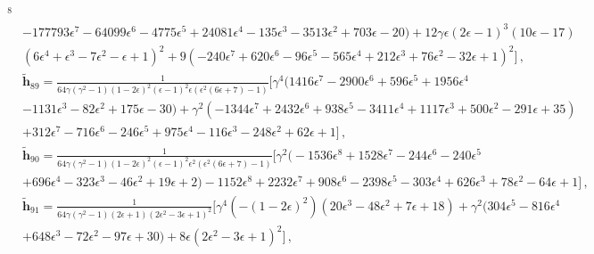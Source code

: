 \begin{align}
\begin{split}
^8\\&-177793 \epsilon ^7-64099 \epsilon ^6-4775 \epsilon ^5+24081 \epsilon ^4-135 \epsilon ^3-3513 \epsilon ^2+703 \epsilon -20\big)+12 \gamma  \epsilon  (2 \epsilon -1)^3 (10 \epsilon -17)\\& \left(6 \epsilon ^4+\epsilon ^3-7 \epsilon ^2-\epsilon +1\right)^2+9 \left(-240 \epsilon ^7+620 \epsilon ^6-96 \epsilon ^5-565 \epsilon ^4+212 \epsilon ^3+76 \epsilon ^2-32 \epsilon +1\right)^2\Bigg]\,,\\& \boldsymbol{\tilde h}_{89}=\frac{1}{64 \gamma  \left(\gamma ^2-1\right) (1-2 \epsilon )^2 (\epsilon -1)^2 \epsilon  \left(\epsilon ^2 (6 \epsilon +7)-1\right)}\Bigg[\gamma ^4 \big(1416 \epsilon ^7-2900 \epsilon ^6+596 \epsilon ^5+1956 \epsilon ^4\\&-1131 \epsilon ^3-82 \epsilon ^2+175 \epsilon -30\big)+\gamma ^2 \left(-1344 \epsilon ^7+2432 \epsilon ^6+938 \epsilon ^5-3411 \epsilon ^4+1117 \epsilon ^3+500 \epsilon ^2-291 \epsilon +35\right)\\&+312 \epsilon ^7-716 \epsilon ^6-246 \epsilon ^5+975 \epsilon ^4-116 \epsilon ^3-248 \epsilon ^2+62 \epsilon +1\Bigg]\,,\\&\boldsymbol{\tilde h}_{90}=\frac{1}{64 \gamma  \left(\gamma ^2-1\right) (1-2 \epsilon )^2 (\epsilon -1)^2 \epsilon ^2 \left(\epsilon ^2 (6 \epsilon +7)-1\right)}\Bigg[\gamma ^2 \big(-1536 \epsilon ^8+1528 \epsilon ^7-244 \epsilon ^6-240 \epsilon ^5\\&+696 \epsilon ^4-323 \epsilon ^3-46 \epsilon ^2+19 \epsilon +2\big)-1152 \epsilon ^8+2232 \epsilon ^7+908 \epsilon ^6-2398 \epsilon ^5-303 \epsilon ^4+626 \epsilon ^3+78 \epsilon ^2-64 \epsilon +1\Bigg]\,,\\&\boldsymbol{\tilde h}_{91}=\frac{1}{64 \gamma  \left(\gamma ^2-1\right) (2 \epsilon +1) \left(2 \epsilon ^2-3 \epsilon +1\right)^2}\Bigg[\gamma ^4 \left(-(1-2 \epsilon )^2\right) \left(20 \epsilon ^3-48 \epsilon ^2+7 \epsilon +18\right)+\gamma ^2 \big(304 \epsilon ^5-816 \epsilon ^4\\&+648 \epsilon ^3-72 \epsilon ^2-97 \epsilon +30\big)+8 \epsilon  \left(2 \epsilon ^2-3 \epsilon +1\right)^2\Bigg]\,,\nonumber
    \end{split}
\end{align}
